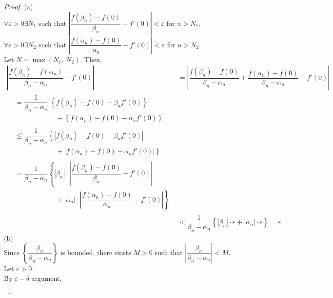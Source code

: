\documentclass[12pt]{book}
\theoremstyle{definition}
\begin{document}
		\begin{proof}
			(a)\\
			$\forall \varepsilon>0\exists N_1$ such that $\left\vert\dfrac{f(\beta_n)-f(0)}{\beta_n}-f'(0)\right\vert<\varepsilon$ for $n>N_1.$\\
			$\forall \varepsilon>0\exists N_2$ such that $\left\vert\dfrac{f(\alpha_n)-f(0)}{\alpha_n}-f'(0)\right\vert<\varepsilon$ for $n>N_2.$\\
			Let $N=\max(N_1,~N_2)$. Then,\\
			\begin{align*}
				\left\vert\dfrac{f(\beta_n)-f(\alpha_n)}{\beta_n-\alpha_n}-f'(0)\right\vert &= \left\vert\dfrac{f(\beta_n)-f(0)}{\beta_n-\alpha_n}+\dfrac{f(\alpha_n)-f(0)}{\beta_n-\alpha_n}-f'(0)\right\vert\\
				\begin{split}
					&=\dfrac{1}{\beta_n-\alpha_n}\left\vert\left\{f(\beta_n)-f(0)-\beta_n f'(0)\right\}\right.\\
					&\qquad\qquad\qquad -\left.{\left\{f(\alpha_n)-f(0)-\alpha_nf'(0)\right\}}\right\vert
				\end{split}\\
				\begin{split}
					&\leq\dfrac{1}{\beta_n-\alpha_n}\left\{\left\vert f(\beta_n)-f(0)-\beta_n f'(0)\right\vert\right.\\
					&\qquad\qquad\qquad +\left.{\left\vert f(\alpha_n)-f(0)-\alpha_nf'(0)\right\vert}\right\}
				\end{split}\\
				\begin{split}
					&=\dfrac{1}{\beta_n-\alpha_n}\left\{|\beta_n|\cdot\left\vert \dfrac{f(\beta_n)-f(0)}{\beta_n}-f'(0)\right\vert\right.\\
					&\qquad\qquad\qquad +\left.{|\alpha_n|\cdot \left\vert \dfrac{f(\alpha_n)-f(0)}{\alpha_n}-f'(0)\right\vert}\right\}
				\end{split}\\
				&<\dfrac{1}{\beta_n-\alpha_n}\left\{|\beta_n|\cdot \varepsilon+|\alpha_n|\cdot\varepsilon\right\}=\varepsilon
			\end{align*}
			(b)\\
			Since $\left\{\dfrac{\beta_n}{\beta_n-\alpha_n}\right\}$ is bounded, there exists $M>0$ such that $\left\vert\dfrac{\beta_n}{\beta_n-\alpha_n}\right\vert<M.$\\
			Let $\varepsilon>0$.\\
			By $\varepsilon-\delta$ argument,
			\begin{align*}

\end{align*}
\end{proof}
\end{document}
